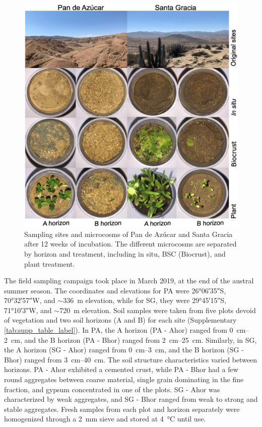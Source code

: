 \begin{figure}[H]
	\centering
	\includegraphics[width=1\textwidth]{img/M3-Figure_1.jpg}
	\caption{Sampling sites and microcosms of Pan de Azúcar and Santa Gracia after 12 weeks of incubation. The different microcosms are separated by horizon and treatment, including in situ, BSC (Biocrust), and plant treatment.}
	\label{fig:M3-F1}
\end{figure}

The field sampling campaign took place in March 2019, at the end of the austral summer season. The coordinates and elevations for PA were \ang{26;06;35}S, \ang{70;32;57}W, and \(\sim\)\SI{336}{\meter} elevation, while for SG, they were \ang{29;45;15}S, \ang{71;10;3}W, and \(\sim\)\SI{720}{\meter} elevation. Soil samples were taken from five plots devoid of vegetation and two soil horizons (A and B) for each site (Supplementary \cref{tab:supp_table_label}). In PA, the A horizon (PA - Ahor) ranged from \SIrange{0}{2}{\centi\metre}, and the B horizon (PA - Bhor) ranged from \SIrange{2}{25}{\centi\metre}. Similarly, in SG, the A horizon (SG - Ahor) ranged from \SIrange{0}{3}{\centi\metre}, and the B horizon (SG - Bhor) ranged from \SIrange{3}{40}{\centi\metre}. The soil structure characteristics varied between horizons. PA - Ahor exhibited a cemented crust, while PA - Bhor had a few round aggregates between coarse material, single grain dominating in the fine fraction, and gypsum concentrated in one of the plots. SG - Ahor was characterized by weak aggregates, and SG - Bhor ranged from weak to strong and stable aggregates. Fresh samples from each plot and horizon separately were homogenized through a \SI{2}{\milli\metre} sieve and stored at \SI{4}{\degreeCelsius} until use.

